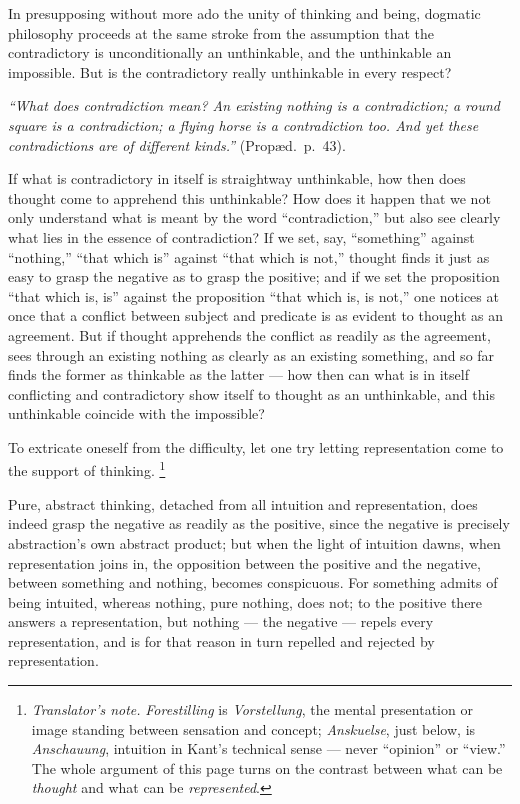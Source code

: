 \documentclass[12pt,a4paper]{book}
\renewcommand{\thefootnote}{\ifcase\value{footnote}\or *)\or **)\or ***)\fi}
\newcommand{\tnote}[1]{%
  \begingroup
  \renewcommand{\thefootnote}{\textdagger}%
  \footnote{\emph{Translator's note.} #1}%
  \addtocounter{footnote}{-1}%
  \endgroup}
\begin{document}
In presupposing without more ado the unity of thinking and being, dogmatic
philosophy proceeds at the same stroke from the assumption that the
contradictory is unconditionally an unthinkable, and the unthinkable an
impossible. But is the contradictory really unthinkable in every respect?

\emph{``What does contradiction mean? An existing nothing is a contradiction; a
round square is a contradiction; a flying horse is a contradiction too. And yet
these contradictions are of different kinds.''} (Propæd.\ p.~43).

If what is contradictory in itself is straightway unthinkable, how then does
thought come to apprehend this unthinkable? How does it happen that we not only
understand what is meant by the word ``contradiction,'' but also see clearly
what lies in the essence of contradiction? If we set, say, ``something''
against ``nothing,'' ``that which is'' against ``that which is not,'' thought
finds it just as easy to grasp the negative as to grasp the positive; and if we
set the proposition ``that which is, is'' against the proposition ``that which
is, is not,'' one notices at once that a conflict between subject and predicate
is as evident to thought as an agreement. But if thought apprehends the
conflict as readily as the agreement, sees through an existing nothing as
clearly as an existing something, and so far finds the former as thinkable as
the latter --- how then can what is in itself conflicting and contradictory
show itself to thought as an unthinkable, and this unthinkable coincide with
the impossible?

To extricate oneself from the difficulty, let one try letting representation
come to the support of thinking.\tnote{\emph{Forestilling} is
\textit{Vorstellung}, the mental presentation or image standing between
sensation and concept; \emph{Anskuelse}, just below, is
\textit{Anschauung}, intuition in Kant's technical sense --- never ``opinion''
or ``view.'' The whole argument of this page turns on the contrast between what
can be \emph{thought} and what can be \emph{represented}.} Pure, abstract
thinking, detached from all intuition and representation, does indeed grasp the
negative as readily as the positive, since the negative is precisely
abstraction's own abstract product; but when the light of intuition dawns, when
representation joins in, the opposition between the positive and the negative,
between something and nothing, becomes conspicuous. For something admits of
being intuited, whereas nothing, pure nothing, does not; to the positive there
answers a representation, but nothing --- the negative --- repels every
representation, and is for that reason in turn repelled and rejected by
representation.
\end{document}
